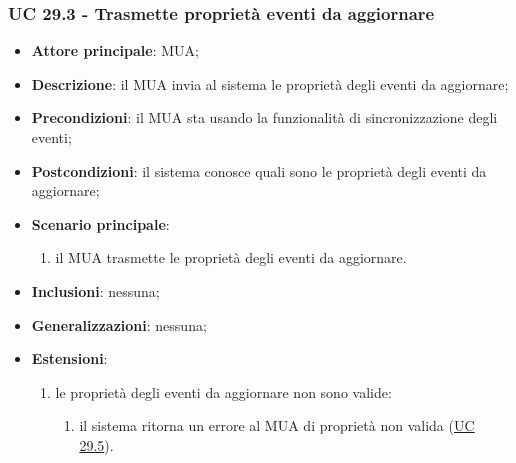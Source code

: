     \subsubsection{UC 29.3 - Trasmette proprietà eventi da aggiornare} \label{sec:UC29.3}
    \begin{itemize}
        \item \textbf{Attore principale}: MUA;
        \item \textbf{Descrizione}: il MUA invia al sistema le proprietà degli eventi da aggiornare;
        \item \textbf{Precondizioni}: il MUA sta usando la funzionalità di sincronizzazione degli eventi;
        \item \textbf{Postcondizioni}: il sistema conosce quali sono le proprietà degli eventi da aggiornare;
        \item \textbf{Scenario principale}:
            \begin{enumerate}
                \item il MUA trasmette le proprietà degli eventi da aggiornare.
            \end{enumerate}
        \item \textbf{Inclusioni}: nessuna;
        \item \textbf{Generalizzazioni}: nessuna;
        \item \textbf{Estensioni}:
            \begin{enumerate}[label=\alph*.]
                \item le proprietà degli eventi da aggiornare non sono valide:
                \begin{enumerate}[label=\arabic*.]
                    \item il sistema ritorna un errore al MUA di proprietà non valida (\hyperref[sec:UC29.5]{UC 29.5}).
                \end{enumerate}
            \end{enumerate}
    \end{itemize}


